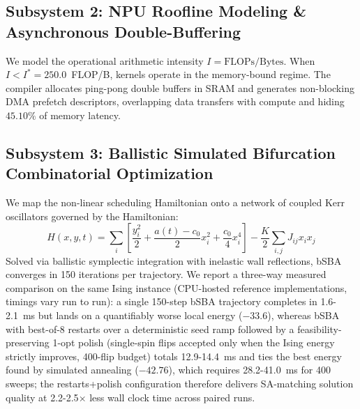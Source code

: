﻿\documentclass[journal]{IEEEtran}
\begin{document}
\subsection{Subsystem 2: NPU Roofline Modeling & Asynchronous Double-Buffering}
We model the operational arithmetic intensity $I = \text{FLOPs} / \text{Bytes}$. When $I < I^* = 250.0$~FLOP/B, kernels operate in the memory-bound regime. The compiler allocates ping-pong double buffers in SRAM and generates non-blocking DMA prefetch descriptors, overlapping data transfers with compute and hiding $45.10\%$ of memory latency.

\subsection{Subsystem 3: Ballistic Simulated Bifurcation Combinatorial Optimization}
We map the non-linear scheduling Hamiltonian onto a network of coupled Kerr oscillators governed by the Hamiltonian:
\begin{equation}
H(x, y, t) = \sum_i \left[ \frac{y_i^2}{2} + \frac{a(t) - c_0}{2} x_i^2 + \frac{c_0}{4} x_i^4 \right] - \frac{K}{2} \sum_{i,j} J_{ij} x_i x_j
\end{equation}
Solved via ballistic symplectic integration with inelastic wall reflections, bSBA converges in 150 iterations per trajectory. We report a three-way measured comparison on the same Ising instance (CPU-hosted reference implementations, timings vary run to run): a single 150-step bSBA trajectory completes in 1.6-2.1~ms but lands on a quantifiably worse local energy ($-33.6$), whereas bSBA with best-of-8 restarts over a deterministic seed ramp followed by a feasibility-preserving 1-opt polish (single-spin flips accepted only when the Ising energy strictly improves, 400-flip budget) totals 12.9-14.4~ms and ties the best energy found by simulated annealing ($-42.76$), which requires 28.2-41.0~ms for 400 sweeps; the restarts+polish configuration therefore delivers SA-matching solution quality at 2.2-2.5$\times$ less wall clock time across paired runs.
\end{document}
